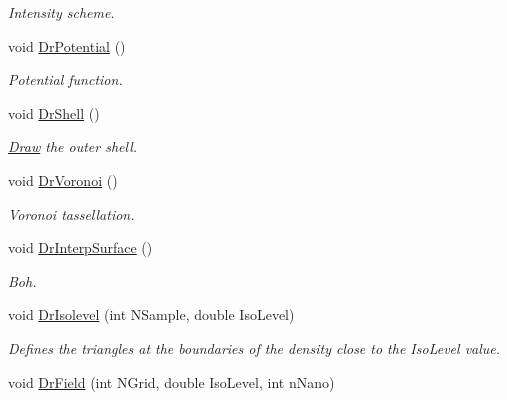\begin{DoxyCompactItemize}
\begin{DoxyCompactList}\small\item\em Intensity scheme. \end{DoxyCompactList}\item 
void \hyperlink{classElPoly_ab1a8c31a875c7270e5e4ed06aa0490f8}{Dr\+Potential} ()\hypertarget{classElPoly_ab1a8c31a875c7270e5e4ed06aa0490f8}{}\label{classElPoly_ab1a8c31a875c7270e5e4ed06aa0490f8}

\begin{DoxyCompactList}\small\item\em Potential function. \end{DoxyCompactList}\item 
void \hyperlink{classElPoly_af1718b93c06170aa9002bdbd0dc15bdd}{Dr\+Shell} ()\hypertarget{classElPoly_af1718b93c06170aa9002bdbd0dc15bdd}{}\label{classElPoly_af1718b93c06170aa9002bdbd0dc15bdd}

\begin{DoxyCompactList}\small\item\em \hyperlink{classDraw}{Draw} the outer shell. \end{DoxyCompactList}\item 
void \hyperlink{classElPoly_a5214a3da3e41c63d5c0d36e020ed295c}{Dr\+Voronoi} ()\hypertarget{classElPoly_a5214a3da3e41c63d5c0d36e020ed295c}{}\label{classElPoly_a5214a3da3e41c63d5c0d36e020ed295c}

\begin{DoxyCompactList}\small\item\em Voronoi tassellation. \end{DoxyCompactList}\item 
void \hyperlink{classElPoly_a6f21a42e28c3633aa1f57be5ff26e3aa}{Dr\+Interp\+Surface} ()\hypertarget{classElPoly_a6f21a42e28c3633aa1f57be5ff26e3aa}{}\label{classElPoly_a6f21a42e28c3633aa1f57be5ff26e3aa}

\begin{DoxyCompactList}\small\item\em Boh. \end{DoxyCompactList}\item 
void \hyperlink{classElPoly_ac33065bd12bc1315d48c4fc60acf3e99}{Dr\+Isolevel} (int N\+Sample, double Iso\+Level)
\begin{DoxyCompactList}\small\item\em Defines the triangles at the boundaries of the density close to the Iso\+Level value. \end{DoxyCompactList}\item 
void \hyperlink{classElPoly_ae5093f79e99758c116e6957ce8bd5bce}{Dr\+Field} (int N\+Grid, double Iso\+Level, int n\+Nano)\hypertarget{classElPoly_ae5093f79e99758c116e6957ce8bd5bce}{}\label{classElPoly_ae5093f79e99758c116e6957ce8bd5bce}


\end{DoxyCompactItemize}

